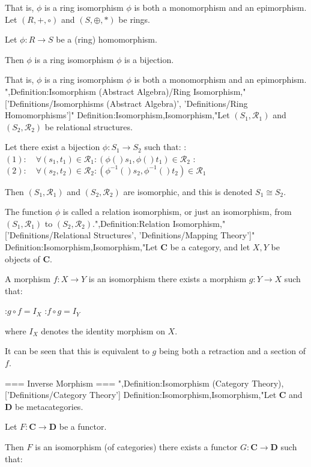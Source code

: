 That is, $\phi$ is a ring isomorphism  $\phi$ is both a monomorphism and an epimorphism.
Let $\left( R, +, \circ \right)$ and $\left( S, \oplus, * \right)$ be rings.

Let $\phi: R \to S$ be a (ring) homomorphism.


Then $\phi$ is a ring isomorphism  $\phi$ is a bijection.

That is, $\phi$ is a ring isomorphism  $\phi$ is both a monomorphism and an epimorphism.
",Definition:Isomorphism (Abstract Algebra)/Ring Isomorphism,"['Definitions/Isomorphisms (Abstract Algebra)', 'Definitions/Ring Homomorphisms']"
Definition:Isomorphism,Isomorphism,"Let $\left( S_1, \mathcal R_1 \right)$ and $\left( S_2, \mathcal R_2 \right)$ be relational structures.

Let there exist a bijection $\phi: S_1 \to S_2$ such that:
:$(1): \quad \forall \left( s_1, t_1 \right) \in \mathcal R_1: \left( \phi \left(   \right){s_1}, \phi \left(   \right){t_1}  \right) \in \mathcal R_2$
:$(2): \quad \forall \left( s_2, t_2 \right) \in \mathcal R_2: \left( \phi^{-1}  \left(   \right){s_2}, \phi^{-1}  \left(   \right){t_2}  \right) \in \mathcal R_1$


Then $\left( S_1, \mathcal R_1 \right)$ and $\left( S_2, \mathcal R_2 \right)$ are isomorphic, and this is denoted $S_1 \cong S_2$.


The function $\phi$ is called a relation isomorphism, or just an isomorphism, from $\left( S_1, \mathcal R_1 \right)$ to $\left( S_2, \mathcal R_2 \right)$.",Definition:Relation Isomorphism,"['Definitions/Relational Structures', 'Definitions/Mapping Theory']"
Definition:Isomorphism,Isomorphism,"Let $\mathbf C$ be a category, and let $X, Y$ be objects of $\mathbf C$.


A morphism $f: X \to Y$ is an isomorphism  there exists a morphism $g: Y \to X$ such that:

:$g \circ f = I_X$
:$f \circ g = I_Y$

where $I_X$ denotes the identity morphism on $X$.

It can be seen that this is equivalent to $g$ being both a retraction and a section of $f$.


=== Inverse Morphism ===
",Definition:Isomorphism (Category Theory),['Definitions/Category Theory']
Definition:Isomorphism,Isomorphism,"Let $\mathbf C$ and $\mathbf D$ be metacategories.

Let $F: \mathbf C \to \mathbf D$ be a functor.


Then $F$ is an isomorphism (of categories)  there exists a functor $G: \mathbf C \to \mathbf D$ such that:

